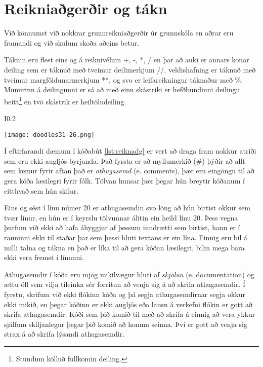 \section{Reikniaðgerðir og tákn}\label{uk:tolur-reiknivirkjar}
Við könnumst við nokkrar grunnreikniaðgerðir úr grunnskóla en aðrar eru framandi og við skulum skoða aðeins betur.

Táknin eru flest eins og á reiknivélum +, -, *, / en þar að auki er annars konar deiling sem er táknuð með tveimur deilimerkjum //, veldishafning er táknuð með tveimur margföldunarmerkjum **, og svo er leifareikningur táknaður með \%.
Munurinn á deilingunni er sá að með einu skástriki er hefðbundinni deilingu beitt\footnote{Stundum kölluð fullkomin deiling.} en tvö skástrik er heiltöludeiling.
\begin{wrapfigure}{I}{0.2\textwidth}
	\begin{center}
		\texttt{[image: doodles31-26.png]}
	\end{center}
\end{wrapfigure}

Í eftirfarandi dæmum í kóðabút \ref{lst:reiknadg} er vert að draga fram nokkur atriði sem eru ekki augljós byrjanda. 
Það fyrsta er að myllumerkið (\#) þýðir að allt sem kemur fyrir aftan það er \textit{athugasemd} (e. comments), þær eru eingöngu til að gera kóða læsilegri fyrir fólk. Tölvan hunsar þær þegar hún breytir kóðanum í eitthvað sem hún skilur.

Eins og sést í línu númer 20 er athugasemdin svo löng að hún birtist okkur sem tvær línur, en hún er í keyrslu tölvunnar álitin ein heild línu 20.
Þess vegna þurfum við ekki að hafa áhyggjur af þessum inndrætti sem birtist, hann er í rauninni ekki til staðar þar sem þessi hluti textans er ein lína.
Einnig eru bil á milli talna og tákna en það er líka til að gera kóðan læsilegri, bilin mega bara ekki vera fremst í línunni.

Athugasemdir í kóða eru mjög mikilvægur hluti af \emph{skjölun} (e. documentation) og ættu öll sem vilja tileinka sér forritun að venja sig á að skrifa athugasemdir.
Í fyrstu, skrifum við ekki flókinn kóða og þá segja athugasemdirnar segja okkur ekki mikið, en þegar kóðinn er ekki augljós eða lausn á verkefni flókin er gott að skrifa athugasemdir.
Kóði sem þið komið til með að skrifa á einnig að vera ykkur sjálfum skiljanlegur þegar þið komið að honum seinna.
Því er gott að venja sig strax á að skrifa lýsandi athugasemdir. 

